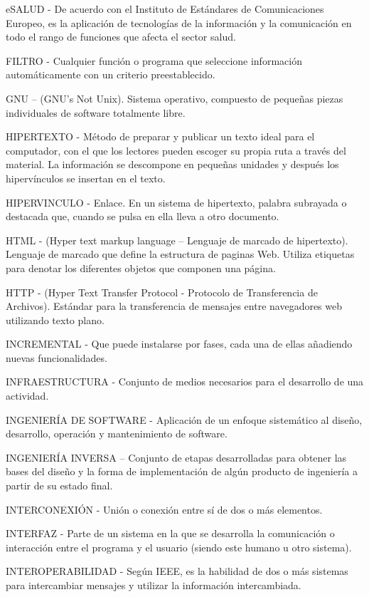 eSALUD - De acuerdo con el Instituto de Estándares de Comunicaciones Europeo, es la aplicación de tecnologías de la información y la comunicación en todo el rango de funciones que afecta el sector salud. 

FILTRO - Cualquier función o programa que seleccione información automáticamente con un criterio preestablecido.

GNU – (GNU’s Not Unix). Sistema operativo, compuesto de pequeñas piezas individuales de software totalmente libre.

HIPERTEXTO - Método de preparar y publicar un texto ideal para el computador, con el que los lectores pueden escoger su propia ruta a través del material. La información se descompone en pequeñas unidades y después los hipervínculos se insertan en el texto.

HIPERVINCULO - Enlace. En un sistema de hipertexto, palabra subrayada o destacada que, cuando se pulsa en ella lleva a otro documento.

HTML - (Hyper text markup language – Lenguaje de marcado de hipertexto). Lenguaje de marcado que define la estructura de paginas Web. Utiliza etiquetas para denotar los diferentes objetos que componen una página.

HTTP -  (Hyper Text Transfer Protocol - Protocolo de Transferencia de Archivos). Estándar para la transferencia de mensajes entre navegadores web utilizando texto plano.

INCREMENTAL - Que puede instalarse por fases, cada una de ellas añadiendo nuevas funcionalidades.

INFRAESTRUCTURA - Conjunto de medios necesarios para el desarrollo de una actividad. 

INGENIERÍA DE SOFTWARE - Aplicación de un enfoque sistemático al diseño, desarrollo, operación y mantenimiento de software​.

INGENIERÍA INVERSA – Conjunto de etapas desarrolladas para obtener las bases del diseño y la forma de implementación de algún producto de ingeniería a partir de su estado final.

INTERCONEXIÓN - Unión o conexión entre sí de dos o más elementos.

INTERFAZ - Parte de un sistema en la que se desarrolla la comunicación o interacción entre el programa y el usuario (siendo este humano u otro sistema).

INTEROPERABILIDAD - Según IEEE, es la habilidad de dos o más sistemas para intercambiar mensajes y utilizar la información intercambiada.

